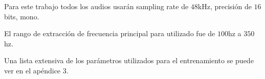 \idemSectyYMitrol

Para este trabajo todos los audios usarán sampling rate de $48$kHz, precisión de $16$bits, mono.

El rango de extracción de frecuencia principal para  utilizado fue de $100$hz a $350$hz.

Una lista extensiva de los parámetros utilizados para el entrenamiento se puede ver en el apéndice $3$.

